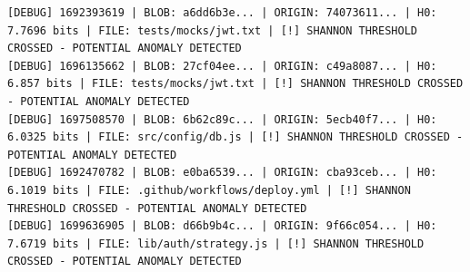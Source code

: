 \documentclass[12pt, a4paper, oneside]{report}
\begin{document}
\begin{lstlisting}[basicstyle=\tiny\ttfamily]
[DEBUG] 1692393619 | BLOB: a6dd6b3e... | ORIGIN: 74073611... | H0: 7.7696 bits | FILE: tests/mocks/jwt.txt | [!] SHANNON THRESHOLD CROSSED - POTENTIAL ANOMALY DETECTED
[DEBUG] 1696135662 | BLOB: 27cf04ee... | ORIGIN: c49a8087... | H0: 6.857 bits | FILE: tests/mocks/jwt.txt | [!] SHANNON THRESHOLD CROSSED - POTENTIAL ANOMALY DETECTED
[DEBUG] 1697508570 | BLOB: 6b62c89c... | ORIGIN: 5ecb40f7... | H0: 6.0325 bits | FILE: src/config/db.js | [!] SHANNON THRESHOLD CROSSED - POTENTIAL ANOMALY DETECTED
[DEBUG] 1692470782 | BLOB: e0ba6539... | ORIGIN: cba93ceb... | H0: 6.1019 bits | FILE: .github/workflows/deploy.yml | [!] SHANNON THRESHOLD CROSSED - POTENTIAL ANOMALY DETECTED
[DEBUG] 1699636905 | BLOB: d66b9b4c... | ORIGIN: 9f66c054... | H0: 7.6719 bits | FILE: lib/auth/strategy.js | [!] SHANNON THRESHOLD CROSSED - POTENTIAL ANOMALY DETECTED
\end{lstlisting}
\newpage
\end{document}
